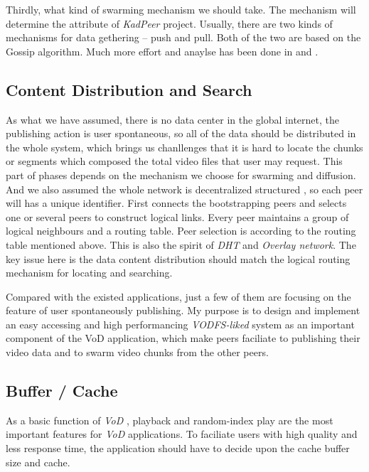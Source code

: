{Thirdly, what kind of swarming mechanism we should take. The mechanism will determine the attribute of \emph{KadPeer} project.
Usually, there are two kinds of mechanisms for data gethering -- push and pull. Both of the two are based on the Gossip algorithm. Much more effort and anaylse has been done in \cite{LargeScaleLiveMedia} and \cite{PushbasedSceduling}.

}

\subsection{Content Distribution and Search}
{
  As what we have assumed, there is no data center in the global internet, the publishing action is user spontaneous, so all of the data should be distributed in the whole system, which brings us chanllenges that it is hard to locate the chunks or segments which composed the total video files that user may request.
This part of phases depends on the mechanism we choose for swarming and diffusion.
And we also assumed the whole network is decentralized structured , so each peer will has a unique identifier. 
First connects the bootstrapping peers and selects one or several peers to construct logical links. 
Every peer maintains a group of logical neighbours and a routing table.
Peer selection is according to the routing table mentioned above.
This is also the spirit of \emph{DHT} and \emph{Overlay network}.
The key issue here is the data content distribution should match the logical routing mechanism for locating and searching.

Compared with the existed applications, just a few of them are focusing on the feature of user spontaneously publishing.
My purpose is to design and implement an easy accessing and high performancing \emph{VODFS-liked} system as an important component of the VoD application, which make peers faciliate to publishing their video data and to swarm video chunks from the other peers.

}

\subsection{Buffer / Cache}
{
As a basic function of \emph{VoD} , playback and random-index play are the most important features for \emph{VoD} applications.
To faciliate users with high quality and less response time, the application should have to decide upon the cache buffer size and cache.
}

